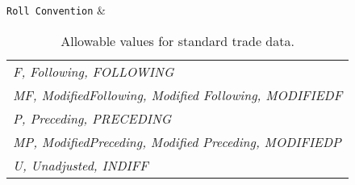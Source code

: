 \begin{table}[H]
\begin{tabu}
    \lstinline!Roll Convention! & \begin{tabular}[l]{@{}l@{}} 
\emph{F,  Following, FOLLOWING}\\ 
\emph{MF, ModifiedFollowing, Modified Following, MODIFIEDF}\\ 
\emph{P, Preceding, PRECEDING}\\ 
\emph{MP, ModifiedPreceding, Modified Preceding, MODIFIEDP}\\ 
\emph{U, Unadjusted, INDIFF }\end{tabular}  \\ \hline
  \end{tabu}
  \caption{Allowable values for standard trade data.}
  \label{tab:allow_stand_data}
\end{table}


